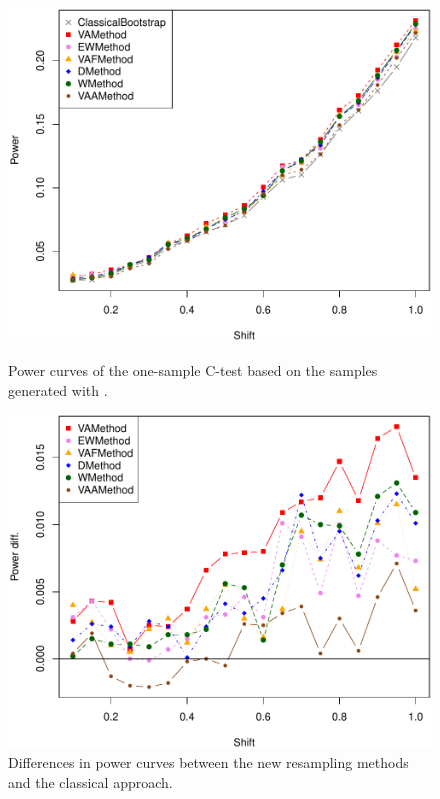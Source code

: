\begin{figure}[htbp]
  \centering
	\begin{minipage}[b]{0.45\linewidth}
	\includegraphics[scale=0.4]{power_plot_1_v3.pdf}
	\caption{Power curves of the one-sample C-test based on the samples generated with .}
	\label{fig1power}
	\end{minipage}  
\quad
\begin{minipage}[b]{0.45\linewidth}
	\includegraphics[scale=0.4]{power_plot_2_v3.pdf}
	\caption{Differences in power curves between the new resampling methods and the classical approach.}
	\label{fig2power}
	\end{minipage}  
\end{figure}


